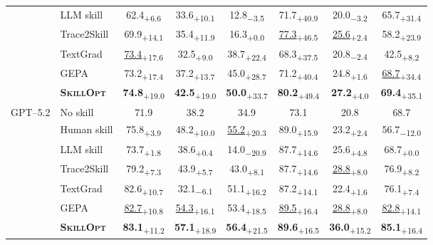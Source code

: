 \documentclass[
]{article}
\providecommand{\mrowcell}{}
\newcommand{\ourmethod}{\textsc{SkillOpt}\xspace}
\newcommand{\dvalp}[2]{\hphantom{\textsubscript{+#2}}#1\textsubscript{\textcolor{deltapos}{+#2}}}
\newcommand{\dvaln}[2]{\hphantom{\textsubscript{$-$#2}}#1\textsubscript{\textcolor{deltaneg}{$-$#2}}}
\newcommand{\methodcell}[1]{\cellcolor{blue!8}#1}
\begin{document}
\begin{table}[!htbp]
\begin{tabular}{l l c c c c c c}
\mrowcell & LLM skill & \dvalp{62.4}{6.6} & \dvalp{33.6}{10.1} & \dvaln{12.8}{3.5} & \dvalp{71.7}{40.9} & \dvaln{20.0}{3.2} & \dvalp{65.7}{31.4} \\
\mrowcell & Trace2Skill & \dvalp{69.9}{14.1} & \dvalp{35.4}{11.9} & \dvalp{16.3}{0.0} & \dvalp{\underline{77.3}}{46.5} & \dvalp{\underline{25.6}}{2.4} & \dvalp{58.2}{23.9} \\
\mrowcell & TextGrad & \dvalp{\underline{73.4}}{17.6} & \dvalp{32.5}{9.0} & \dvalp{38.7}{22.4} & \dvalp{68.3}{37.5} & \dvaln{20.8}{2.4} & \dvalp{42.5}{8.2} \\
\mrowcell & GEPA & \dvalp{73.2}{17.4} & \dvalp{37.2}{13.7} & \dvalp{45.0}{28.7} & \dvalp{71.2}{40.4} & \dvalp{24.8}{1.6} & \dvalp{\underline{68.7}}{34.4} \\
\mrowcell & \methodcell{\textbf{\ourmethod{}}} & \methodcell{\dvalp{\textbf{74.8}}{19.0}} & \methodcell{\dvalp{\textbf{42.5}}{19.0}} & \methodcell{\dvalp{\textbf{50.0}}{33.7}} & \methodcell{\dvalp{\textbf{80.2}}{49.4}} & \methodcell{\dvalp{\textbf{27.2}}{4.0}} & \methodcell{\dvalp{\textbf{69.4}}{35.1}} \\
\cmidrule(lr){1-8}
\multirow{7}{*}{GPT--5.2} & No skill & 71.9 & 38.2 & 34.9 & 73.1 & 20.8 & 68.7 \\
\mrowcell & Human skill & \dvalp{75.8}{3.9} & \dvalp{48.2}{10.0} & \dvalp{\underline{55.2}}{20.3} & \dvalp{89.0}{15.9} & \dvalp{23.2}{2.4} & \dvaln{56.7}{12.0} \\
\mrowcell & LLM skill & \dvalp{73.7}{1.8} & \dvalp{38.6}{0.4} & \dvaln{14.0}{20.9} & \dvalp{87.7}{14.6} & \dvalp{25.6}{4.8} & \dvalp{68.7}{0.0} \\
\mrowcell & Trace2Skill & \dvalp{79.2}{7.3} & \dvalp{43.9}{5.7} & \dvalp{43.0}{8.1} & \dvalp{87.7}{14.6} & \dvalp{\underline{28.8}}{8.0} & \dvalp{76.9}{8.2} \\
\mrowcell & TextGrad & \dvalp{82.6}{10.7} & \dvaln{32.1}{6.1} & \dvalp{51.1}{16.2} & \dvalp{87.2}{14.1} & \dvalp{22.4}{1.6} & \dvalp{76.1}{7.4} \\
\mrowcell & GEPA & \dvalp{\underline{82.7}}{10.8} & \dvalp{\underline{54.3}}{16.1} & \dvalp{53.4}{18.5} & \dvalp{\underline{89.5}}{16.4} & \dvalp{\underline{28.8}}{8.0} & \dvalp{\underline{82.8}}{14.1} \\
\mrowcell & \methodcell{\textbf{\ourmethod{}}} & \methodcell{\dvalp{\textbf{83.1}}{11.2}} & \methodcell{\dvalp{\textbf{57.1}}{18.9}} & \methodcell{\dvalp{\textbf{56.4}}{21.5}} & \methodcell{\dvalp{\textbf{89.6}}{16.5}} & \methodcell{\dvalp{\textbf{36.0}}{15.2}} & \methodcell{\dvalp{\textbf{85.1}}{16.4}} \\

\end{tabular}
\end{table}
\end{document}
